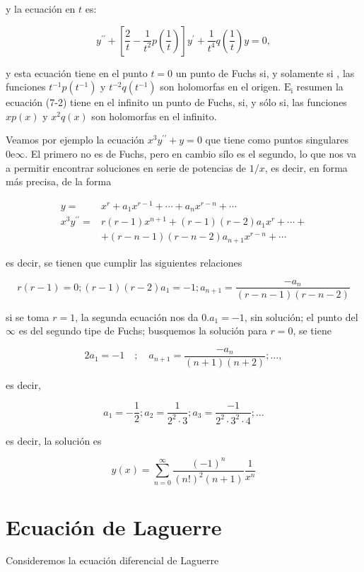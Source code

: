 \documentclass[10pt]{article}
\theoremstyle{plain}
\theoremstyle{definition}
\theoremstyle{remark}
\begin{document}
y la ecuación en $t$ es:

$$
y^{\prime \prime}+\left[\frac{2}{t}-\frac{1}{t^{2}} p\left(\frac{1}{t}\right)\right] y^{\prime}+\frac{1}{t^{4}} q\left(\frac{1}{t}\right) y=0,
$$

y esta ecuación tiene en el punto $t=0$ un punto de Fuchs si, y solamente si , las funciones $t^{-1} p\left(t^{-1}\right)$ y $t^{-2} q\left(t^{-1}\right)$ son holomorfas en el origen. $\mathrm{E}_{\mathrm{i}}$ resumen la ecuación (7-2) tiene en el infinito un punto de Fuchs, si, y sólo si, las funciones $x p(x)$ y $x^{2} q(x)$ son holomorfas en el infinito.

Veamos por ejemplo la ecuación $x^{3} y^{\prime \prime}+y=0$ que tiene como puntos singulares $0 \mathrm{e} \infty$. El primero no es de Fuchs, pero en cambio sílo es el segundo, lo que nos va a permitir encontrar soluciones en serie de potencias de $1 / x$, es decir, en forma más precisa, de la forma

$$
\begin{aligned}
y= & x^{r}+a_{1} x^{r-1}+\cdots+a_{n} x^{r-n}+\cdots \\
x^{3} y^{\prime \prime}= & r(r-1) x^{n+1}+(r-1)(r-2) a_{1} x^{r}+\cdots+ \\
& +(r-n-1)(r-n-2) a_{n+1} x^{r-n}+\cdots
\end{aligned}
$$

es decir, se tienen que cumplir las siguientes relaciones

$$
r(r-1)=0 ;(r-1)(r-2) a_{1}=-1 ; a_{n+1}=\frac{-a_{n}}{(r-n-1)(r-n-2)}
$$

si se toma $r=1$, la segunda ecuación nos da $0 . a_{1}=-1$, sin solución; el punto del $\infty$ es del segundo tipe de Fuchs; busquemos la solución para $r=0$, se tiene

$$
2 a_{1}=-1 \quad ; \quad a_{n+1}=\frac{-a_{n}}{(n+1)(n+2)} ; \ldots,
$$

es decir,

$$
a_{1}=-\frac{1}{2} ; a_{2}=\frac{1}{2^{2} \cdot 3} ; a_{3}=\frac{-1}{2^{2} \cdot 3^{2} \cdot 4} ; \ldots
$$

es decir, la solución es

$$
y(x)=\sum_{n=0}^{\infty} \frac{(-1)^{n}}{(n!)^{2}(n+1)} \frac{1}{x^{n}}
$$

\section{Ecuación de Laguerre}
Consideremos la ecuación diferencial de Laguerre
\end{document}
